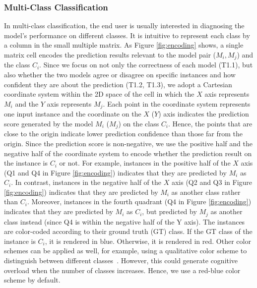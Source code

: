 \documentclass[preprint,journal]{vgtc}       %
\begin{document}
\subsubsection{Multi-Class Classification}
In multi-class classification, the end user is usually interested in diagnosing the model's performance on different classes. It is intuitive to represent each class by a column in the small multiple matrix. As Figure \ref{fig:encoding} shows, a single matrix cell encodes the prediction results relevant to the model pair ($M_i, M_j$) and the class $C_i$. Since we focus on not only the correctness of each model (T1.1), but also whether the two models agree or disagree on specific instances and how confident they are about the prediction (T1.2, T1.3), we adopt a Cartesian coordinate system within the 2D space of the cell in which the $X$ axis represents $M_i$ and the $Y$ axis represents $M_j$. Each point in the coordinate system represents one input instance and the coordinate on the $X$ ($Y$) axis indicates the prediction score generated by the model $M_i$ ($M_j$) on the class $C_i$. Hence, the points that are close to the origin indicate lower prediction confidence than those far from the origin. Since the prediction score is non-negative, we use the positive half and the negative half of the coordinate system to encode whether the prediction result on the instance is $C_i$ or not. For example, instances in the positive half of the $X$ axis (Q1 and Q4 in Figure \ref{fig:encoding}) indicates that they are predicted by $M_i$ as $C_i$. In contrast, instances in the negative half of the $X$ axis (Q2 and Q3 in Figure \ref{fig:encoding}) indicates that they are predicted by $M_i$ as another class rather than $C_i$. Moreover, instances in the fourth quadrant (Q4 in Figure \ref{fig:encoding}) indicates that they are predicted by $M_i$ as $C_i$, but predicted by $M_j$ as another class instead (since Q4 is within the negative half of the Y axis). The instances are color-coded according to their ground truth (GT) class. If the GT class of the instance is $C_i$, it is rendered in blue. Otherwise, it is rendered in red. Other color schemes can be applied as well, for example, using a qualitative color scheme to distinguish between different classes~\cite{ren2017squares}. However, this could generate cognitive overload when the number of classes increases. Hence, we use a red-blue color scheme by default.
\end{document}
